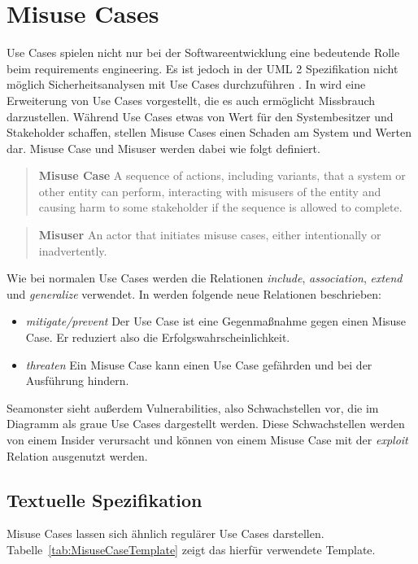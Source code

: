 \section{Misuse Cases}

Use Cases spielen nicht nur bei der Softwareentwicklung eine bedeutende Rolle beim requirements engineering. Es ist jedoch in der UML 2 Spezifikation nicht möglich Sicherheitsanalysen mit Use Cases durchzuführen \cite{sindre2005eliciting}. 
In \cite{sindre2005eliciting} wird eine Erweiterung von Use Cases vorgestellt, die es auch ermöglicht Missbrauch darzustellen. Während Use Cases etwas von Wert für den Systembesitzer und Stakeholder schaffen, stellen Misuse Cases einen Schaden am System und Werten dar.
Misuse Case und Misuser werden dabei wie folgt definiert.
\begin{quote}
\textbf{Misuse Case} A sequence of actions, including variants, that a system or other entity can perform, interacting with misusers of the entity and causing harm to some stakeholder if the sequence is allowed to complete. \cite{sindre2005eliciting}
\end{quote}

\begin{quote}
\textbf{Misuser} An actor that initiates misuse cases, either intentionally or inadvertently. \cite{sindre2005eliciting}
\end{quote}

Wie bei normalen Use Cases werden die Relationen \textit{include}, \textit{association}, \textit{extend} und \textit{generalize} verwendet.
In \cite{sindre2005eliciting} werden folgende neue Relationen beschrieben:
\begin{itemize}
\item \textit{mitigate/prevent} Der Use Case ist eine Gegenmaßnahme gegen einen Misuse Case. Er reduziert also die Erfolgswahrscheinlichkeit.
\item \textit{threaten} Ein Misuse Case kann einen Use Case gefährden und bei der Ausführung hindern.
\end{itemize}

Seamonster sieht außerdem Vulnerabilities, also Schwachstellen vor, die im Diagramm als graue Use Cases dargestellt werden. Diese Schwachstellen werden von einem Insider verursacht und können von einem Misuse Case mit der \textit{exploit} Relation ausgenutzt werden.

\subsection{Textuelle Spezifikation}
Misuse Cases lassen sich ähnlich regulärer Use Cases darstellen. Tabelle~\ref{tab:MisuseCaseTemplate} zeigt das hierfür verwendete Template. 

